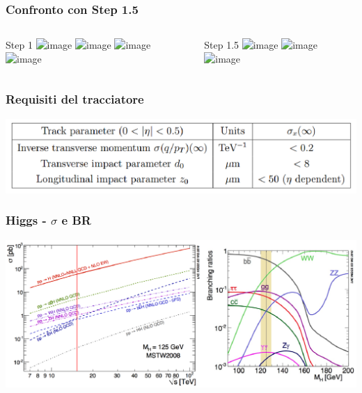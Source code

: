 \documentclass{beamer}
\begin{document}
\begin{frame}
\frametitle{Confronto con Step 1.5}
\begin{columns}
\begin{column}{.5\textwidth}
\centering
Step 1
\includegraphics<1>[width=\textwidth,height=5cm]{Tracking/InclBrl4/pipu200_sigQPt_abseta}
\includegraphics<2>[width=\textwidth,height=5cm]{Tracking/InclBrl4/pipu200_sigD0_abseta}
\includegraphics<3>[width=\textwidth,height=5cm]{Tracking/InclBrl4/pipu200_sigZ0_abseta}
\includegraphics<4>[width=\textwidth,height=5cm]{Tracking/InclBrl4/pipu200_sigZ0_abseta_zoom}
\end{column}
\begin{column}{.5\textwidth}
\centering
Step 1.5
\includegraphics<1>[width=\textwidth, height=5cm]{nick_sigQpt_abseta}
\includegraphics<2>[width=\textwidth, height=5cm]{nick_sigD0_abseta}
\includegraphics<3->[width=\textwidth, height=5cm]{nick_sigZ0_abseta}
\end{column}
\end{columns}
\end{frame}

\begin{frame}
\frametitle{Requisiti del tracciatore}
\centering
\includegraphics[width=.9\textwidth]{Tracking/requirements}
 \end{frame}

\begin{frame}
\frametitle{Higgs - $\sigma$ e BR}
\includegraphics[width=\textwidth]{Higgs_cs_br}
\end{frame}
\end{document}
